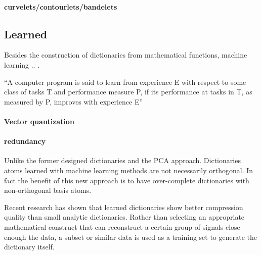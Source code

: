 \paragraph{curvelets/contourlets/bandelets}


\subsection{Learned}


Besides the construction of dictionaries from mathematical functions, machine
learning .. .


``A computer program is said to learn from experience E with respect to
some class of tasks T and performance measure P, if its performance at tasks in
T, as measured by P, improves with experience E''


\paragraph{Vector quantization}



\paragraph{redundancy}
Unlike the former designed dictionaries and the PCA approach. Dictionaries atoms
learned with machine learning methods are not necessarily orthogonal. In fact
the benefit of this new approach is to have over-complete dictionaries with
non-orthogonal basis atoms.



Recent research has shown that learned dictionaries show better
compression quality than small analytic dictionaries\cite{Chen1998}.
\cite{Aharon2006} \cite{Mairal2010} Rather than selecting an appropriate
mathematical construct that can reconstruct a certain group of signals close
enough the data, a subset or similar data is used as a training set to generate
the dictionary itself.




